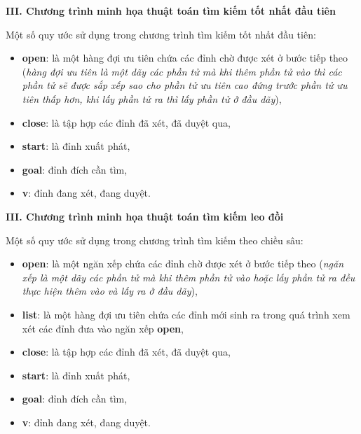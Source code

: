 \renewcommand{\baselinestretch}{1.15}


\renewcommand{\baselinestretch}{1.3}
\noindent
{\bf III. Chương trình minh họa thuật toán tìm kiếm tốt nhất đầu tiên}

Một số quy ước sử dụng trong chương trình tìm kiếm tốt nhất đầu tiên:
\begin{itemize}
	\item {\bf open}: là một hàng đợi ưu tiên chứa các đỉnh chờ được xét ở bước tiếp theo ({\em hàng đợi ưu tiên là một dãy các phần tử mà khi thêm phần tử vào thì các phần tử sẽ được sắp xếp sao cho phần tử ưu tiên cao đứng trước phần tử ưu tiên thấp hơn, khi lấy phần tử ra thì lấy phần tử ở đầu dãy}),
	\item {\bf close}: là tập hợp các đỉnh đã xét, đã duyệt qua,
	\item {\bf start}: là đỉnh xuất phát,
	\item {\bf goal}: đỉnh đích cần tìm,
	\item {\bf v}: đỉnh đang xét, đang duyệt.
\end{itemize}

\renewcommand{\baselinestretch}{1.15}


\renewcommand{\baselinestretch}{1.3}
\noindent
{\bf III. Chương trình minh họa thuật toán tìm kiếm leo đồi}

Một số quy ước sử dụng trong chương trình tìm kiếm theo chiều sâu:
\begin{itemize}
	\item {\bf open}: là một ngăn xếp chứa các đỉnh chờ được xét ở bước tiếp theo ({\em ngăn xếp là một dãy các phần tử mà khi thêm phần tử vào hoặc lấy phần tử ra đều thực hiện thêm vào và lấy ra ở đầu dãy}),
	\item {\bf list}: là một hàng đợi ưu tiên chứa các đỉnh mới sinh ra trong quá trình xem xét các đỉnh đưa vào ngăn xếp {\bf open},
	\item {\bf close}: là tập hợp các đỉnh đã xét, đã duyệt qua,
	\item {\bf start}: là đỉnh xuất phát,
	\item {\bf goal}: đỉnh đích cần tìm,
	\item {\bf v}: đỉnh đang xét, đang duyệt.
\end{itemize}

